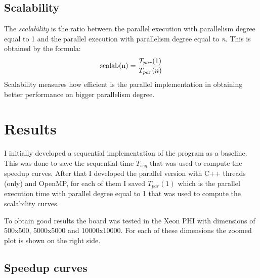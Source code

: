 \documentclass[a4paper,10pt]{article}
\begin{document}
\subsection{Scalability}
The \textit{scalability} is the ratio between the parallel execution with parallelism degree equal to 1 and the parallel execution with parallelism degree equal to \textit{n}. This is obtained by the formula:
\begin{equation}
\textnormal{scalab(n)} = \frac{T_{par}(1)}{T_{par}(n)}
\end{equation}
Scalability measures how efficient is the parallel implementation in obtaining better performance on bigger parallelism degree.
\section{Results}
I initially developed a sequential implementation of the program as a baseline. This was done to save the sequential time $T_{seq}$ that was used to compute the speedup curves. After that I developed the parallel version with C++ threads (only) and OpenMP, for each of them I saved $T_{par}(1)$ which is the parallel execution time with parallel degree equal to 1 that was used to compute the scalability curves. 

To obtain good results the board was tested in the Xeon PHI with dimensions of 500x500, 5000x5000 and 10000x10000. For each of these dimensions the zoomed plot is shown on the right side. 



\subsection{Speedup curves}
\end{document}
